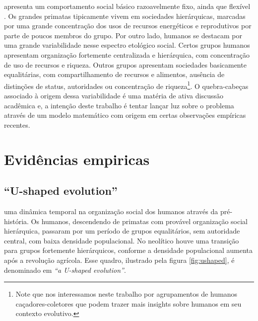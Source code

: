 apresenta um comportamento social básico razoavelmente fixo, ainda que flexível \citep{Boehm2001}. Os grandes primatas tipicamente vivem em sociedades hierárquicas, marcadas por uma grande concentração dos usos de recursos energéticos e reprodutivos por parte de poucos membros do grupo. Por outro lado, humanos se destacam por uma grande variabilidade nesse espectro etológico social. Certos grupos humanos apresentam organização fortemente centralizada e hierárquica, com concentração de uso de recursos e riqueza. Outros grupos apresentam sociedades basicamente equalitárias, com compartilhamento de recursos e alimentos, ausência de distinções de status, autoridades ou concentração de riqueza\footnote[][-3cm]{Note que nos interessamos neste trabalho por agrupamentos de humanos caçadores-coletores que podem trazer mais insights sobre humanos em seu contexto evolutivo.}. O quebra-cabeças associado à origem dessa variabilidade é uma matéria de ativa discussão acadêmica e, a intenção deste trabalho é tentar lançar luz sobre o problema através de um modelo matemático com origem em certas observações empíricas recentes.

\section{Evidências empiricas}

\subsection{``U-shaped evolution''} 
 uma dinâmica temporal na organização social dos humanos através da pré-história\cite[-7cm]{Knauft1991, Marcus2008, Foley1987}. Os humanos, descendendo de primatas com provável organização social hierárquica, passaram por um período de grupos equalitários, sem autoridade central, com baixa densidade populacional. No neolítico houve uma transição para grupos fortemente hierárquicos, conforme a densidade populacional aumenta após a revolução agrícola. Esse quadro, ilustrado pela figura \ref{fig:ushaped}, é denominado em \citep{Knauft1991} \emph{``a U-shaped evolution''}. 

